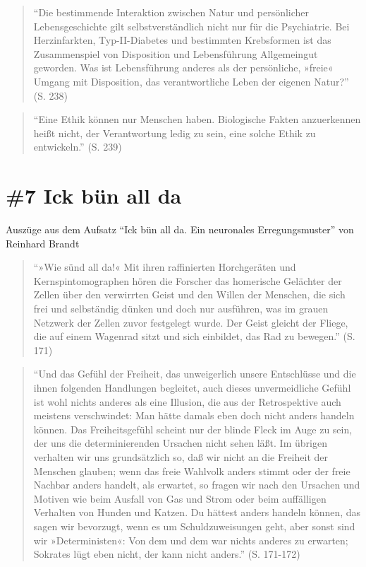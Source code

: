 \documentclass[
  a4paper,
]{report}
\begin{document}
\begin{quote}
``Die bestimmende Interaktion zwischen Natur und persönlicher Lebensgeschichte gilt selbstverständlich nicht nur für die Psychiatrie. Bei Herzinfarkten, Typ-II-Diabetes und bestimmten Krebsformen ist das Zusammenspiel von Disposition und Lebensführung Allgemeingut geworden. Was ist Lebensführung anderes als der persönliche, »freie« Umgang mit Disposition, das verantwortliche Leben der eigenen Natur?'' (S. 238)
\end{quote}

\begin{quote}
``Eine Ethik können nur Menschen haben. Biologische Fakten anzuerkennen heißt nicht, der Verantwortung ledig zu sein, eine solche Ethik zu entwickeln.'' (S. 239)
\end{quote}

\hypertarget{def-ev7}{%
\section{\#7 Ick bün all da}\label{def-ev7}}

Auszüge aus dem Aufsatz ``Ick bün all da. Ein neuronales Erregungsmuster'' von Reinhard Brandt \citeyearpar{Brandt2004}

\begin{quote}
``»Wie sünd all da!« Mit ihren raffinierten Horchgeräten und Kernspintomographen hören die Forscher das homerische Gelächter der Zellen über den verwirrten Geist und den Willen der Menschen, die sich frei und selbständig dünken und doch nur ausführen, was im grauen Netzwerk der Zellen zuvor festgelegt wurde. Der Geist gleicht der Fliege, die auf einem Wagenrad sitzt und sich einbildet, das Rad zu bewegen.'' (S. 171)
\end{quote}

\begin{quote}
``Und das Gefühl der Freiheit, das unweigerlich unsere Entschlüsse und die ihnen folgenden Handlungen begleitet, auch dieses unvermeidliche Gefühl ist wohl nichts anderes als eine Illusion, die aus der Retrospektive auch meistens verschwindet: Man hätte damals eben doch nicht anders handeln können. Das Freiheitsgefühl scheint nur der blinde Fleck im Auge zu sein, der uns die determinierenden Ursachen nicht sehen läßt. Im übrigen verhalten wir uns grundsätzlich so, daß wir nicht an die Freiheit der Menschen glauben; wenn das freie Wahlvolk anders stimmt oder der freie Nachbar anders handelt, als erwartet, so fragen wir nach den Ursachen und Motiven wie beim Ausfall von Gas und Strom oder beim auffälligen Verhalten von Hunden und Katzen. Du hättest anders handeln können, das sagen wir bevorzugt, wenn es um Schuldzuweisungen geht, aber sonst sind wir »Deterministen«: Von dem und dem war nichts anderes zu erwarten; Sokrates lügt eben nicht, der kann nicht anders.'' (S. 171-172)
\end{quote}
\end{document}
